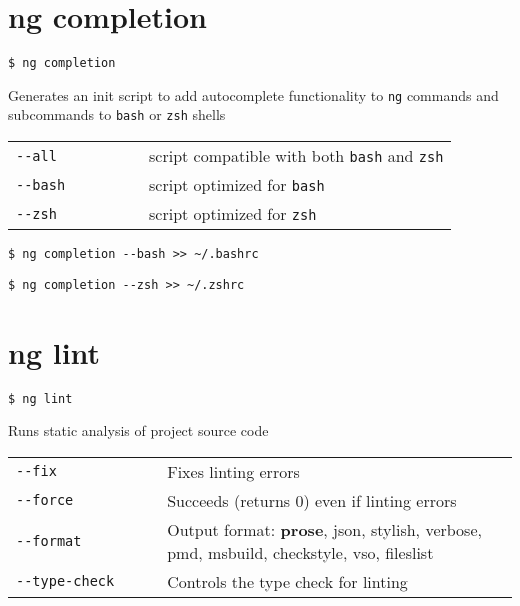 \documentclass[8pt]{extarticle} %
\begin{document}
\begin{multicols}{3}
\section*{ng completion}

  \vspace{1ex}
  {\tt \$ ng completion \itt{[options...]}}

  \vspace{0.6ex}

  {\small Generates an init script to add autocomplete functionality to {\tt ng} commands and subcommands to {\tt bash} or {\tt zsh} shells}

  \vspace{0.6ex}

  \begin{tabular}{L{0.30\linewidth} L{0.70\linewidth}}
    \tt -{}-all  & \small script compatible with both {\tt bash} and {\tt zsh} \\
    \tt -{}-bash & \small script optimized for {\tt bash} \\
    \tt -{}-zsh  & \small script optimized for {\tt zsh}
  \end{tabular}

  \vspace{0.6ex}

  {\tt \$ ng completion -{}-bash >{}> \textasciitilde/.bashrc}

  {\tt \$ ng completion -{}-zsh >{}> \textasciitilde/.zshrc}

\section*{ng lint}

  \vspace{1ex}
  {\tt \$ ng lint \itt{[options...]}}

  \vspace{0.6ex}

  {\small Runs static analysis of project source code}

  \begin{tabular}{L{0.30\linewidth} L{0.70\linewidth}}
    \tt -{}-fix  & \small Fixes linting errors \\
    \tt -{}-force  & \small Succeeds (returns 0) even if linting errors \\
    \tt -{}-format & \small Output format: {\bf prose}, json, stylish, verbose, pmd, msbuild, checkstyle, vso, fileslist \\
    \tt -{}-type-check & \small Controls the type check for linting
  \end{tabular}


\end{multicols}
\end{document}
